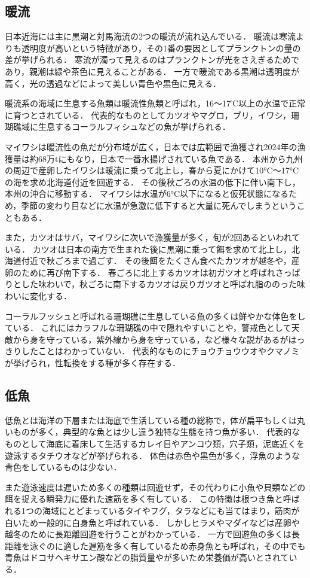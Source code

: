 \documentclass[12pt,a4j,titlepage]{ltjsarticle}
\begin{document}
\subsection{暖流}
日本近海には主に黒潮と対馬海流の2つの暖流が流れ込んでいる．
暖流は寒流よりも透明度が高いという特徴があり，その1番の要因としてプランクトンの量の差が挙げられる．
寒流が濁って見えるのはプランクトンが光をさえぎるためであり，親潮は緑や茶色に見えることがある．
一方で暖流である黒潮は透明度が高く，光の透過などによって美しい青色や黒色に見える．\par
暖流系の海域に生息する魚類は暖流性魚類と呼ばれ，16〜17℃以上の水温で正常に育つとされている．
代表的なものとしてカツオやマグロ，ブリ，イワシ，珊瑚礁域に生息するコーラルフィシュなどの魚が挙げられる．\par
マイワシは暖流性の魚だが分布域が広く，日本では広範囲で漁獲され2024年の漁獲量は約68万tにもなり，日本で一番水揚げされている魚である．
本州から九州の周辺で産卵したイワシは暖流に乗って北上し，春から夏にかけて10°C〜17°Cの海を求め北海道付近を回遊する．
その後秋ごろの水温の低下に伴い南下し，本州の沖合に移動する．
マイワシは水温が6°C以下になると仮死状態になるため，季節の変わり目などに水温が急激に低下すると大量に死んでしまうということもある．\par
また，カツオはサバ，マイワシに次いで漁獲量が多く，旬が2回あるといわれている．
カツオは日本の南方で生まれた後に黒潮に乗って餌を求めて北上し，北海道付近で秋ごろまで過ごす．
その後餌をたくさん食べたカツオが越冬や，産卵のために再び南下する．
春ごろに北上するカツオは初ガツオと呼ばれさっぱりとした味わいで，秋ごろに南下するカツオは戻りガツオと呼ばれ脂ののった味わいに変化する．\par
コーラルフッシュと呼ばれる珊瑚礁に生息している魚の多くは鮮やかな体色をしている\cite{nettaigyo}．
これにはカラフルな珊瑚礁の中で隠れやすいことや，警戒色として天敵から身を守っている，紫外線から身を守っている，など様々な説があるがはっきりしたことはわかっていない．
代表的なものにチョウチョウウオやクマノミが挙げられ，性転換をする種が多く存在する．
\subsection{低魚}
低魚とは海洋の下層または海底で生活している種の総称で，体が扁平もしくは丸いものが多く，典型的な魚とは少し違う独特な生態を持つ魚が多い．
代表的なものとして海底に着床して生活するカレイ目やアンコウ類，穴子類，泥底近くを遊泳するタチウオなどが挙げられる．
体色は赤色や黒色が多く，浮魚のような青色をしているものは少ない．\par
また遊泳速度は遅いため多くの種類は回遊せず，その代わりに小魚や貝類などの餌を捉える瞬発力に優れた速筋を多く有している．
この特徴は根つき魚と呼ばれる1つの海域にとどまっているタイやフグ，タラなどにも当てはまり，筋肉が白いため一般的に白身魚と呼ばれている\cite{iro}．
しかしヒラメやマダイなどは産卵や越冬のために長距離回遊を行うことがわかっている．
一方で回遊魚の多くは長距離を泳ぐのに適した遅筋を多く有しているため赤身魚とも呼ばれ，その中でも青魚はドコサヘキサエン酸などの脂質量やが多いため栄養価が高いとされている．
\end{document}
